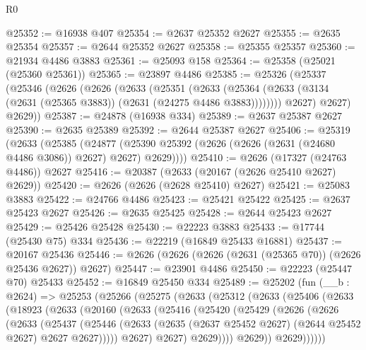 \begin{lexlean}{R0}
\begin{coremodule}
@25352 := @16938 @407
@25354 := @2637 @25352 @2627
@25355 := @2635 @25354
@25357 := @2644 @25352 @2627
@25358 := @25355 @25357
@25360 := @21934 @4486 @3883
@25361 := @25093 @158
@25364 := @25358 (@25021 (@25360 @25361))
@25365 := @23897 @4486
@25385 := @25326
    (@25337
      (@25346
        (@2626
          (@2626
            (@2633
              (@25351
                (@2633
                  (@25364 (@2633 (@3134 (@2631 (@25365 @3883)) (@2631 (@24275 @4486 @3883))))))))
            @2627)
          @2627)
        @2629))
@25387 := @24878 (@16938 @334)
@25389 := @2637 @25387 @2627
@25390 := @2635 @25389
@25392 := @2644 @25387 @2627
@25406 := @25319
    (@2633
      (@25385
        (@24877 (@25390 @25392 (@2626 (@2626 (@2631 (@24680 @4486 @3086)) @2627) @2627) @2629))))
@25410 := @2626 (@17327 (@24763 @4486)) @2627
@25416 := @20387 (@2633 (@20167 (@2626 @25410 @2627) @2629))
@25420 := @2626 (@2626 (@2628 @25410) @2627)
@25421 := @25083 @3883
@25422 := @24766 @4486
@25423 := @25421 @25422
@25425 := @2637 @25423 @2627
@25426 := @2635 @25425
@25428 := @2644 @25423 @2627
@25429 := @25426 @25428
@25430 := @22223 @3883
@25433 := @17744 (@25430 @75) @334
@25436 := @22219 (@16849 @25433 @16881)
@25437 := @20167 @25436
@25446 := @2626 (@2626 (@2626 (@2631 (@25365 @70)) (@2626 @25436 @2627)) @2627)
@25447 := @23901 @4486
@25450 := @22223 (@25447 @70) @25433
@25452 := @16849 @25450 @334
@25489 := @25202
    (fun (__b : @2624) =>
    @25253
      (@25266
        (@25275
          (@2633
            (@25312
              (@2633
                (@25406
                  (@2633
                    (@18923
                      (@2633
                        (@20160
                          (@2633
                            (@25416
                              (@25420
                                (@25429
                                  (@2626
                                    (@2626
                                      (@2633
                                        (@25437
                                          (@25446
                                            (@2633
                                              (@2635
                                                (@2637 @25452 @2627)
                                                (@2644 @25452 @2627)
                                                @2627
                                                @2627)))))
                                      @2627)
                                    @2627)
                                  @2629))))
                          @2629))
                      @2629))))))

\end{coremodule}
\end{lexlean}
